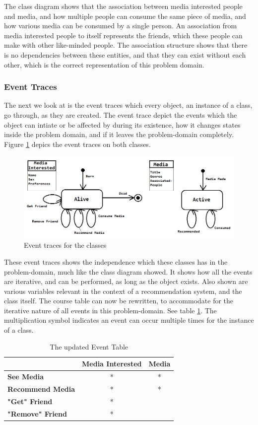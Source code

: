 The class diagram shows that the association between media interested people and media, and how multiple people can consume the same piece of media, and how various media can be consumed by a single person. An association from media interested people to itself represents the friends, which these people can make with other like-minded people. The association structure shows that there is no dependencies between these entities, and that they can exist without each other, which is the correct representation of this problem domain.

\subsubsection{Event Traces}

The next we look at is the event traces which every object, an instance of a class, go through, as they are created. The event trace depict the events which the object can intiate or be affected by during its existence, how it changes states inside the problem domain, and if it leaves the problem-domain completely. Figure \ref{Courses} depics the event traces on both classes.

\begin{figure}[htb]
\centering
\includegraphics[width=1\textwidth]{Images/courses.png}
\caption{Event traces for the classes}
\label{Courses}
\end{figure}

These event traces shows the independence which these classes has in the problem-domain, much like the class diagram showed. It shows how all the events are iterative, and can be performed, as long as the object exists. Also shown are various variables relevant in the context of a recommendation system, and the class itself. The course table can now be rewritten, to accommodate for the iterative nature of all events in this problem-domain. See table \ref{UpdatedEventTable}. The multiplication symbol indicates an event can occur multiple times for the instance of a class.

\begin{table}[htb]
\centering
\begin{tabular}{|l|c|c|} \hline
	  & \textbf{Media Interested} & \textbf{Media} \\ \hline
	\textbf{See Media} & * & * \\ \hline
	\textbf{Recommend Media} & * & * \\ \hline
	\textbf{"Get" Friend} & * &  \\ \hline
	\textbf{"Remove" Friend} & * &  \\ \hline
\end{tabular}
\caption{The updated Event Table}
\label{UpdatedEventTable}
\end{table}